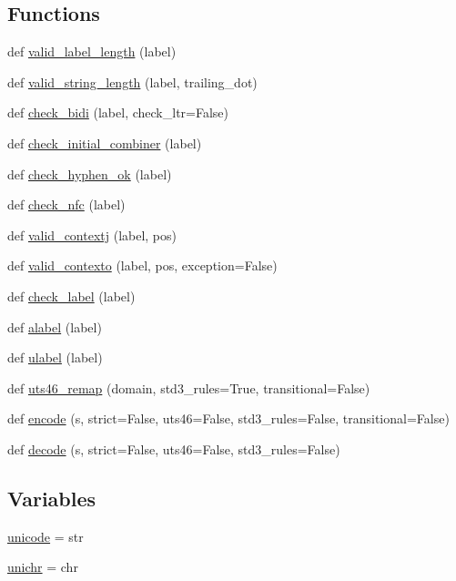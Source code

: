 \subsection*{Functions}
\begin{DoxyCompactItemize}
\item 
def \hyperlink{namespaceidna_1_1core_a790fa74868ea6a233858ad48c5da1810}{valid\+\_\+label\+\_\+length} (label)
\item 
def \hyperlink{namespaceidna_1_1core_a88df31eba7706fd79f9e22e0ee6d1261}{valid\+\_\+string\+\_\+length} (label, trailing\+\_\+dot)
\item 
def \hyperlink{namespaceidna_1_1core_a08e1883cbe9b46e1a416180dfcfe5911}{check\+\_\+bidi} (label, check\+\_\+ltr=False)
\item 
def \hyperlink{namespaceidna_1_1core_a3aad9d001a2155584a5c0a3e920db44c}{check\+\_\+initial\+\_\+combiner} (label)
\item 
def \hyperlink{namespaceidna_1_1core_acb7767ca6cc614b38c8c2ecd9f696836}{check\+\_\+hyphen\+\_\+ok} (label)
\item 
def \hyperlink{namespaceidna_1_1core_a180a774b0867e0b0db8490455f117fd6}{check\+\_\+nfc} (label)
\item 
def \hyperlink{namespaceidna_1_1core_ae7d843c0a918b6870e9c42a51ed7c805}{valid\+\_\+contextj} (label, pos)
\item 
def \hyperlink{namespaceidna_1_1core_a359875d6c190a0bb0aebd3d515f55ee1}{valid\+\_\+contexto} (label, pos, exception=False)
\item 
def \hyperlink{namespaceidna_1_1core_ab9852539538eb1bfc7a2a9184f5f8267}{check\+\_\+label} (label)
\item 
def \hyperlink{namespaceidna_1_1core_a86a57741e1e51a16d322b051c951ca40}{alabel} (label)
\item 
def \hyperlink{namespaceidna_1_1core_ac179e29d76b8dbc9de9fbbdbc9baba30}{ulabel} (label)
\item 
def \hyperlink{namespaceidna_1_1core_a2178e53e2ec5ef62f55547d5c1a1bb2e}{uts46\+\_\+remap} (domain, std3\+\_\+rules=True, transitional=False)
\item 
def \hyperlink{namespaceidna_1_1core_a59837421830fcf4bf8126228c24e192f}{encode} (s, strict=False, uts46=False, std3\+\_\+rules=False, transitional=False)
\item 
def \hyperlink{namespaceidna_1_1core_a0312c7fa932b9144f382f6577ae6ab42}{decode} (s, strict=False, uts46=False, std3\+\_\+rules=False)
\end{DoxyCompactItemize}
\subsection*{Variables}
\begin{DoxyCompactItemize}
\item 
\hyperlink{namespaceidna_1_1core_ac5587948a1b7fb15b15aa4a7a7f5c969}{unicode} = str
\item 
\hyperlink{namespaceidna_1_1core_a782c47a73895d20d3fe0ebac7739a313}{unichr} = chr
\end{DoxyCompactItemize}


